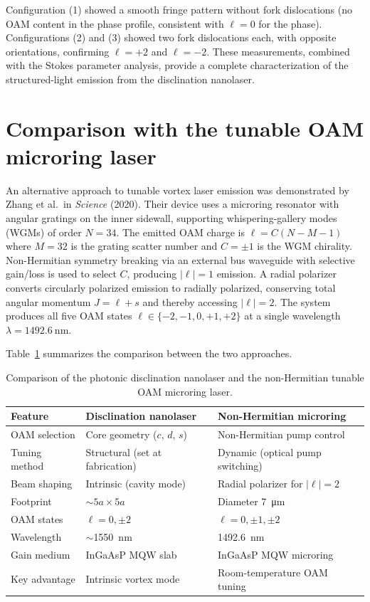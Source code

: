 \documentclass[12pt,a4paper,oneside]{book}
\theoremstyle{plain}
\theoremstyle{definition}
\theoremstyle{remark}
\newcommand{\tabref}[1]{Table~\ref{#1}}
\begin{document}
Configuration (1) showed a smooth fringe pattern without fork dislocations (no OAM content in the phase profile, consistent with $\ell=0$ for the phase). Configurations (2) and (3) showed two fork dislocations each, with opposite orientations, confirming $\ell = +2$ and $\ell = -2$. These measurements, combined with the Stokes parameter analysis, provide a complete characterization of the structured-light emission from the disclination nanolaser.

\section{Comparison with the tunable OAM microring laser}
\label{sec:comparison}

An alternative approach to tunable vortex laser emission was demonstrated by Zhang et al.\ in \textit{Science} (2020). Their device uses a microring resonator with angular gratings on the inner sidewall, supporting whispering-gallery modes (WGMs) of order $N=34$. The emitted OAM charge is $\ell = C(N-M-1)$ where $M=32$ is the grating scatter number and $C=\pm 1$ is the WGM chirality. Non-Hermitian symmetry breaking via an external bus waveguide with selective gain/loss is used to select $C$, producing $|\ell|=1$ emission. A radial polarizer converts circularly polarized emission to radially polarized, conserving total angular momentum $J = \ell + s$ and thereby accessing $|\ell|=2$. The system produces all five OAM states $\ell \in \{-2,-1,0,+1,+2\}$ at a single wavelength $\lambda = \SI{1492.6}{\nano\metre}$.

\tabref{tab:laser-comparison} summarizes the comparison between the two approaches.

\begin{table}[htbp]
  \centering
  \caption{Comparison of the photonic disclination nanolaser and the non-Hermitian tunable OAM microring laser.}
  \label{tab:laser-comparison}
  \begin{tabular}{lp{5cm}p{5cm}}
    \toprule
    Feature & Disclination nanolaser & Non-Hermitian microring \\
    \midrule
    OAM selection & Core geometry ($c$, $d$, $s$) & Non-Hermitian pump control \\
    Tuning method & Structural (set at fabrication) & Dynamic (optical pump switching) \\
    Beam shaping & Intrinsic (cavity mode) & Radial polarizer for $|\ell|=2$ \\
    Footprint & ${\sim}5a \times 5a$ & Diameter \SI{7}{\micro\metre} \\
    OAM states & $\ell = 0, \pm2$ & $\ell = 0, \pm1, \pm2$ \\
    Wavelength & ${\sim}$\SI{1550}{\nano\metre} & \SI{1492.6}{\nano\metre} \\
    Gain medium & InGaAsP MQW slab & InGaAsP MQW microring \\
    Key advantage & Intrinsic vortex mode & Room-temperature OAM tuning \\
    \bottomrule
  \end{tabular}
\end{table}
\end{document}
